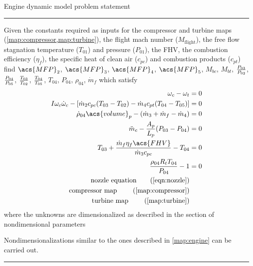 \documentclass[tcc]{subfiles}
\begin{document}
\begin{table}
\centering
    \caption{Engine dynamic model problem statement}
    \label{model:dynamic}
\begin{minipage}{0.7\textwidth}
    \hrule\vspace{2pt}

    Given the constants required as inputs for the compressor and turbine maps (\cref{map:compressor,map:turbine}), 
    the flight mach number ($M_\text{flight}$), the free flow stagnation temperature ($T_{01}$) and pressure ($P_{01}$), 
    the \acf{FHV}, the combustion efficiency ($\eta_f$),
    the specific heat of clean air ($c_{pc}$) and combustion products ($c_{pt}$) \\ 
    find $\acs{MFP}_2$, $\acs{MFP}_3$, $\acs{MFP}_4$, $\acs{MFP}_5$, $M_{bc}$, $M_{bt}$, $\frac{P_{03}}{P_{02}}$, $\frac{P_{04}}{P_{05}}$, $\frac{T_{03}}{T_{02}}$, $\frac{T_{04}}{T_{05}}$, $T_{04}$, $P_{04}$, $\rho_{04}$, $\dot{m}_f$
    which satisfy
\begin{align}
    \omega_c - \omega_t &= 0 \label{eqn:dynamic:rotation} \\
    I \omega_c\dot{\omega}_c - [\dot{m}_2 c_{pc} (T_{03}-T_{02}) - \dot{m}_4 c_{pt}(T_{04}-T_{05})] &= 0 \label{eqn:dynamic:energy}\\
    \dot{\rho}_{04}\acs{volume}_p - (\dot{m}_3 + \dot{m}_f - \dot{m}_4) &= 0 \label{eqn:dynamic:mass} \\
    \ddot{m}_c - \frac{A_p}{L_p}(P_{03}-P_{04}) &=0 \label{eqn:dynamic:momentum} \\
    T_{03} + \frac{\dot{m}_f \eta_f \acs{FHV}}{\dot{m}_3 c_{pc}} - T_{04} &= 0 \label{eqn:dynamic:burn} \\
    \frac{\rho_{04} R_t T_{04}}{P_{04}}  - 1 &= 0\\
    \text{nozzle equation} \tag{\cref{eqn:nozzle}} \\
    \text{compressor map } \tag{\cref{map:compressor}} \\
    \text{turbine map    } \tag{\cref{map:turbine}}
\end{align}
   where the unknowns are dimensionalized as described in the section of nondimensional parameters

   Nondimensionalizations similar to the ones described in \cref{map:engine} can be carried out.

    \vspace{2pt}\hrule
\end{minipage}
\end{table}
\end{document}

